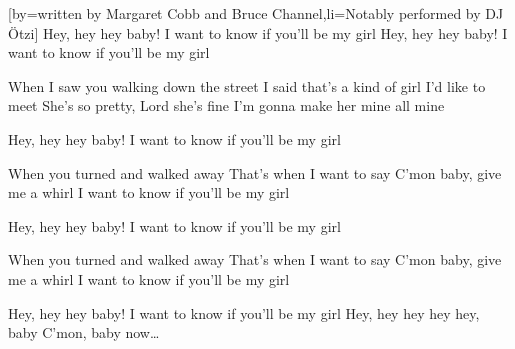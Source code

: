 [by={written by Margaret Cobb and Bruce Channel},li={Notably performed by DJ Ötzi}]
\beginchorus
Hey, hey hey baby! 
I want to know if you'll be my girl 
Hey, hey hey baby! 
I want to know if you'll be my girl 
\endchorus

\beginverse
When I saw you walking down the street 
I said that's a kind of girl I'd like to meet 
She's so pretty, Lord she's fine 
I'm gonna make her mine all mine 
\endverse

\beginchorus
Hey, hey hey baby! 
I want to know if you'll be my girl 
\endchorus

\beginverse
When you turned and walked away 
That's when I want to say 
C'mon baby, give me a whirl 
I want to know if you'll be my girl 
\endverse

\beginchorus
Hey, hey hey baby! 
I want to know if you'll be my girl 
\endchorus

\beginverse
When you turned and walked away 
That's when I want to say 
C'mon baby, give me a whirl 
I want to know if you'll be my girl 
\endverse

\beginchorus
Hey, hey hey baby! 
I want to know if you'll be my girl 
Hey, hey hey hey hey, baby 
C'mon, baby now\dots
\endchorus
\endsong
